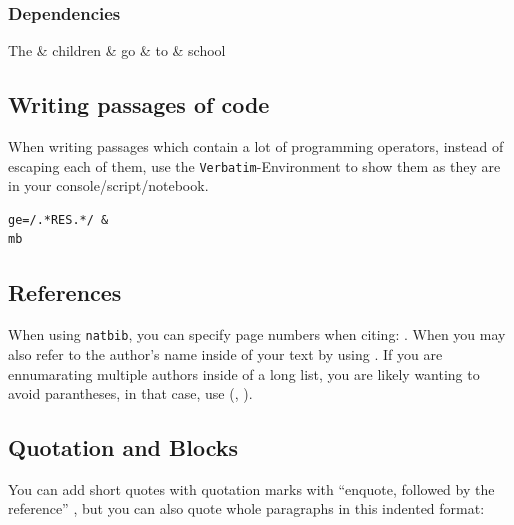 \documentclass{article}
\begin{document}
\subsubsection{Dependencies}

\begin{dependency}[theme = simple]
   \begin{deptext}[column sep=1em]
      The \& children \& {go} \& {to}  \& school\\
   \end{deptext}
\end{dependency}	


\subsection{Writing passages of code}

When writing passages which contain a lot of programming operators, instead of escaping each of them, use the \verb|Verbatim|-Environment to show them as they are in your console/script/notebook.

\begin{Verbatim}
ge=/.*RES.*/ &
mb
\end{Verbatim}


\subsection{References}

When using \verb|natbib|, you can specify page numbers when citing: \citep[e.g.][22]{rose2011third}.
When you may also refer to the author's name inside of your text by using \citet[33]{windfuhr2009iranian}. If you are ennumarating  multiple authors inside of a long list, you are likely wanting to avoid parantheses, in that case, use (\citealt{vydrin2018mande}, \citealt{arcodia2020morphology}).

\subsection{Quotation and Blocks}

You can add short quotes with quotation marks with \enquote{enquote, followed by the reference} \citep[4087]{Forker2020}, but you can also quote whole paragraphs in this indented format:

\begin{quote}

\lipsum[1]\citep[6]{rankin2003synchronic}

\end{quote}
\end{document}
